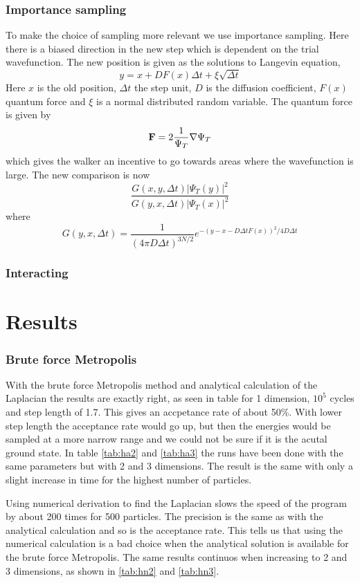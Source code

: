 \documentclass[12pt]{article}
\begin{document}
  \subsubsection{Importance sampling}
  To make the choice of sampling more relevant we use importance sampling.
  Here there is a biased direction in the new step which is dependent on the trial wavefunction.
  The new position is given as the solutions to Langevin equation,
  \begin{equation}
    y = x + DF(x)\Delta t + \xi\sqrt{\Delta t}
  \end{equation}
  Here $x$ is the old position, $\Delta t$ the step unit, $D$ is the diffusion coefficient, 
  $F(x)$ quantum force and $\xi$ is a normal distributed random variable.
  The quantum force is given by 
  \begin{equation}
    {\bf F}= 2\frac{1}{\Psi_T}\nabla\Psi_T
  \end{equation}
  which gives the walker an incentive to go towards areas where the wavefunction is large.
  The new comparison is now
  \begin{equation}
    \frac{G(x,y,\Delta t)|\Psi_T(y)|^2}{G(y,x,\Delta t)|\Psi_T(x)|^2}
  \end{equation}
  where 
  \[ G(y,x,\Delta t) = \frac{1}{(4\pi D\Delta t)^{3N/2}}e^{-(y-x-D\Delta tF(x))^2/4D\Delta t}\]
  \subsubsection{Interacting}

  \newpage
  
  \section{Results}
 
  \subsubsection{Brute force Metropolis}
  
  With the brute force Metropolis method and analytical calculation of the Laplacian the
  results are exactly right, as seen in table for 1 dimension, $10^5$ cycles and step length
  of 1.7. This gives an accpetance rate of about 50\%. With lower step length the acceptance
  rate would go up, but then the energies would be sampled at a more narrow range and we could not
  be sure if it is the acutal ground state.
  In table \ref{tab:ha2} and \ref{tab:ha3} the runs have been done with the same parameters but with
  2 and 3 dimensions. The result is the same with only a slight increase in time for the highest
  number of particles.
  \newpage
  
  Using numerical derivation to find the Laplacian slows the speed of the program by about 200 times
  for 500 particles. The precision is the same as with the analytical calculation and so is the 
  acceptance rate. This tells us that using the numerical calculation is a bad choice when the 
  analytical solution is available for the brute force Metropolis. The same results continuos when
  increasing to 2 and 3 dimensions, as shown in \ref{tab:hn2} and \ref{tab:hn3}.
  
\end{document}
